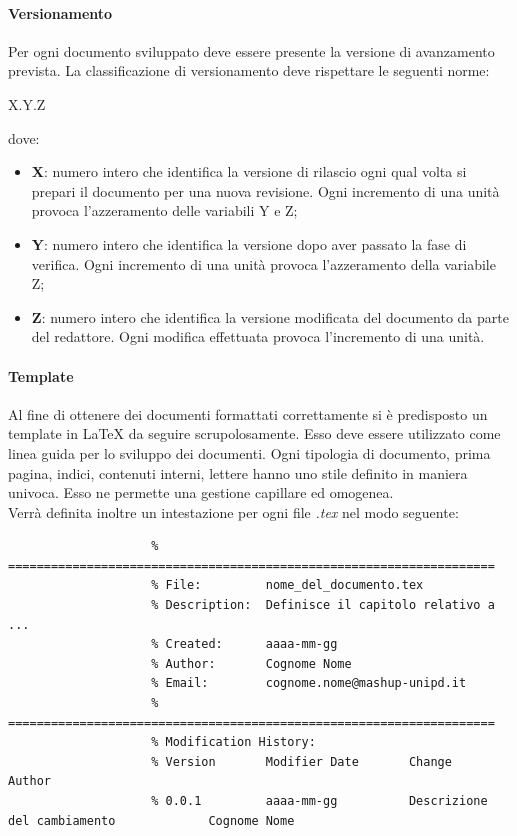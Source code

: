 			\paragraph{Versionamento}
			Per ogni documento sviluppato deve essere presente la versione di avanzamento prevista. La classificazione di versionamento deve rispettare le seguenti norme:
			\begin{center}
				X.Y.Z
			\end{center}
			dove:
			\begin{itemize}
				\item \textbf{X}: numero intero che identifica la versione di rilascio ogni qual volta si prepari il documento per una nuova revisione. Ogni incremento di una unità provoca l'azzeramento delle variabili Y e Z;
				\item \textbf{Y}: numero intero che identifica la versione dopo aver passato la fase di verifica. Ogni incremento di una unità provoca l'azzeramento della variabile Z;
				\item \textbf{Z}: numero intero che identifica la versione modificata del documento da parte del redattore. Ogni modifica effettuata provoca l'incremento di una unità.
			\end{itemize}


			\paragraph{Template}
			Al fine di ottenere dei documenti formattati correttamente si è predisposto un template in \LaTeX{} da seguire scrupolosamente. Esso deve essere utilizzato come linea guida per lo sviluppo dei documenti. Ogni tipologia di documento, prima pagina, indici, contenuti interni, lettere hanno uno stile definito in maniera univoca. Esso ne permette una gestione capillare ed omogenea.\\
			Verrà definita inoltre un intestazione per ogni file \emph{.tex} nel modo seguente:
				\begin{verbatim}
					% ====================================================================
					% File:			nome_del_documento.tex
					% Description:	Definisce il capitolo relativo a ...
					% Created:		aaaa-mm-gg
					% Author:		Cognome Nome
					% Email:		cognome.nome@mashup-unipd.it
					% ====================================================================
					% Modification History:
					% Version		Modifier Date		Change									Author
					% 0.0.1 		aaaa-mm-gg 			Descrizione del cambiamento				Cognome Nome
					
				\end{verbatim}
			\noindent

